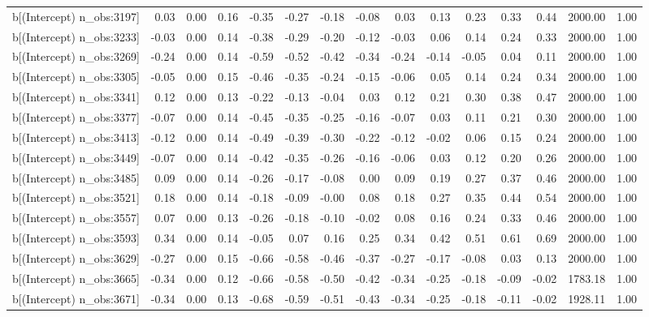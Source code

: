 \begin{table}[ht]
\begin{tabular}{rrrrrrrrrrrrrrr}
  b[(Intercept) n\_obs:3197] & 0.03 & 0.00 & 0.16 & -0.35 & -0.27 & -0.18 & -0.08 & 0.03 & 0.13 & 0.23 & 0.33 & 0.44 & 2000.00 & 1.00 \\ 
  b[(Intercept) n\_obs:3233] & -0.03 & 0.00 & 0.14 & -0.38 & -0.29 & -0.20 & -0.12 & -0.03 & 0.06 & 0.14 & 0.24 & 0.33 & 2000.00 & 1.00 \\ 
  b[(Intercept) n\_obs:3269] & -0.24 & 0.00 & 0.14 & -0.59 & -0.52 & -0.42 & -0.34 & -0.24 & -0.14 & -0.05 & 0.04 & 0.11 & 2000.00 & 1.00 \\ 
  b[(Intercept) n\_obs:3305] & -0.05 & 0.00 & 0.15 & -0.46 & -0.35 & -0.24 & -0.15 & -0.06 & 0.05 & 0.14 & 0.24 & 0.34 & 2000.00 & 1.00 \\ 
  b[(Intercept) n\_obs:3341] & 0.12 & 0.00 & 0.13 & -0.22 & -0.13 & -0.04 & 0.03 & 0.12 & 0.21 & 0.30 & 0.38 & 0.47 & 2000.00 & 1.00 \\ 
  b[(Intercept) n\_obs:3377] & -0.07 & 0.00 & 0.14 & -0.45 & -0.35 & -0.25 & -0.16 & -0.07 & 0.03 & 0.11 & 0.21 & 0.30 & 2000.00 & 1.00 \\ 
  b[(Intercept) n\_obs:3413] & -0.12 & 0.00 & 0.14 & -0.49 & -0.39 & -0.30 & -0.22 & -0.12 & -0.02 & 0.06 & 0.15 & 0.24 & 2000.00 & 1.00 \\ 
  b[(Intercept) n\_obs:3449] & -0.07 & 0.00 & 0.14 & -0.42 & -0.35 & -0.26 & -0.16 & -0.06 & 0.03 & 0.12 & 0.20 & 0.26 & 2000.00 & 1.00 \\ 
  b[(Intercept) n\_obs:3485] & 0.09 & 0.00 & 0.14 & -0.26 & -0.17 & -0.08 & 0.00 & 0.09 & 0.19 & 0.27 & 0.37 & 0.46 & 2000.00 & 1.00 \\ 
  b[(Intercept) n\_obs:3521] & 0.18 & 0.00 & 0.14 & -0.18 & -0.09 & -0.00 & 0.08 & 0.18 & 0.27 & 0.35 & 0.44 & 0.54 & 2000.00 & 1.00 \\ 
  b[(Intercept) n\_obs:3557] & 0.07 & 0.00 & 0.13 & -0.26 & -0.18 & -0.10 & -0.02 & 0.08 & 0.16 & 0.24 & 0.33 & 0.46 & 2000.00 & 1.00 \\ 
  b[(Intercept) n\_obs:3593] & 0.34 & 0.00 & 0.14 & -0.05 & 0.07 & 0.16 & 0.25 & 0.34 & 0.42 & 0.51 & 0.61 & 0.69 & 2000.00 & 1.00 \\ 
  b[(Intercept) n\_obs:3629] & -0.27 & 0.00 & 0.15 & -0.66 & -0.58 & -0.46 & -0.37 & -0.27 & -0.17 & -0.08 & 0.03 & 0.13 & 2000.00 & 1.00 \\ 
  b[(Intercept) n\_obs:3665] & -0.34 & 0.00 & 0.12 & -0.66 & -0.58 & -0.50 & -0.42 & -0.34 & -0.25 & -0.18 & -0.09 & -0.02 & 1783.18 & 1.00 \\ 
  b[(Intercept) n\_obs:3671] & -0.34 & 0.00 & 0.13 & -0.68 & -0.59 & -0.51 & -0.43 & -0.34 & -0.25 & -0.18 & -0.11 & -0.02 & 1928.11 & 1.00 \\ 

\end{tabular}
\end{table}
